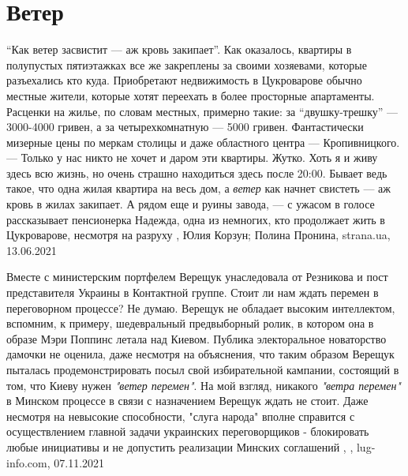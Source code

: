  
 
 
 
 
\chapter{Ветер}
\label{sec:slova.veter}

\enquote{Как ветер засвистит — аж кровь закипает}.
Как оказалось, квартиры в полупустых пятиэтажках все же закреплены за своими
хозяевами, которые разъехались кто куда. Приобретают недвижимость в Цукроварове
обычно местные жители, которые хотят переехать в более просторные апартаменты.
Расценки на жилье, по словам местных, примерно такие: за
\enquote{двушку-трешку} — 3000-4000 гривен, а за четырехкомнатную — 5000
гривен.  Фантастически мизерные цены по меркам столицы и даже областного центра
— Кропивницкого.  — Только у нас никто не хочет и даром эти квартиры. Жутко.
Хоть я и живу здесь всю жизнь, но очень страшно находиться здесь после 20:00.
Бывает ведь такое, что одна жилая квартира на весь дом, а \emph{ветер} как
начнет свистеть — аж кровь в жилах закипает. А рядом еще и руины завода, — с
ужасом в голосе рассказывает пенсионерка Надежда, одна из немногих, кто
продолжает жить в Цукроварове, несмотря на разруху
, 
Юлия Корзун; Полина Пронина, strana.ua, 13.06.2021

Вместе с министерским портфелем Верещук унаследовала от Резникова и пост
представителя Украины в Контактной группе. Стоит ли нам ждать перемен в
переговорном процессе? Не думаю. Верещук не обладает высоким интеллектом,
вспомним, к примеру, шедевральный предвыборный ролик, в котором она в образе
Мэри Поппинс летала над Киевом. Публика электоральное новаторство дамочки не
оценила, даже несмотря на объяснения, что таким образом Верещук пыталась
продемонстрировать посыл свой избирательной кампании, состоящий в том, что
Киеву нужен \emph{"ветер перемен"}.  На мой взгляд, никакого \emph{"ветра перемен"} в Минском
процессе в связи с назначением Верещук ждать не стоит. Даже несмотря на
невысокие способности, "слуга народа" вполне справится с осуществлением главной
задачи украинских переговорщиков - блокировать любые инициативы и не допустить
реализации Минских соглашений
, 
, lug-info.com, 07.11.2021
